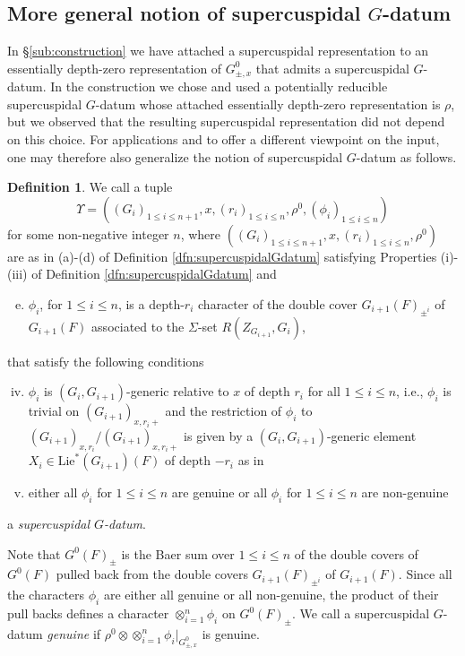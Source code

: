 \documentclass{article}
\theoremstyle{definition}
\newtheorem{dfn}[thm]{Definition}
\numberwithin{equation}{subsection}
\renewcommand{\-}{\hyp{}}
\begin{document}
\subsection{More general notion of supercuspidal $G$-datum} \label{sub:alternativeinput}
In \S\ref{sub:construction} we have attached a supercuspidal representation to an essentially depth-zero representation of $G^0_{\pm, x}$ that admits a supercuspidal $G$-datum. In the construction we chose and used a potentially reducible supercuspidal $G$-datum whose attached essentially depth-zero representation is $\rho$, but we observed that the resulting supercuspidal representation did not depend on this choice. For applications and to offer a different viewpoint on the input, one may therefore also generalize the notion of supercuspidal $G$-datum as follows.
\begin{dfn}
	We call a tuple 
	\[\Upsilon= ((G_i)_{1\leq i\leq n+1},x,(r_i)_{1\leq i\leq n},\rho^0,(\phi_i)_{1\leq i\leq n}) \]
	for some non-negative integer $n$, where $((G_i)_{1\leq i\leq n+1},x,(r_i)_{1\leq i\leq n},\rho^0)$ are as in (a)-(d) of Definition \ref{dfn:supercuspidalGdatum} satisfying Properties (i)-(iii) of Definition \ref{dfn:supercuspidalGdatum} and 
	\begin{enumerate}[(a)]
		\setcounter{enumi}{4}
		\item $\phi_i$, for $1 \leq i \leq n$, is a depth-$r_i$ character of the double cover $G_{i+1}(F)_{\pm^i}$ of $G_{i+1}(F)$ associated to the $\Sigma$-set $R(Z_{G_{i+1}},G_i)$, 
	\end{enumerate}
	that satisfy the following conditions 
	\begin{enumerate}[(i)]
		\setcounter{enumi}{3}
		\item $\phi_i$ is $(G_i, G_{i+1})$-generic relative to $x$ of depth $r_i$ for all $1 \leq i \leq n$, i.e., $\phi_i$ is trivial on $(G_{i+1})_{x,r_i+}$ and the restriction of $\phi_i$ to $(G_{i+1})_{x,r_i}/(G_{i+1})_{x,r_i+}$ is given by a $(G_i, G_{i+1})$-generic element $X_i \in \mathrm{Lie}^*(G_{i+1})(F)$ of depth $-r_i$ as in \cite[Definition~3.8]{Fintzen-IHES} \item either all $\phi_i$ for $1 \leq i \leq n$ are genuine or all $\phi_i$ for $1 \leq i \leq n$ are non-genuine 
	\end{enumerate}
	a \emph{supercuspidal $G$-datum}. 
	
	Note that $G^0(F)_{\pm}$ is the Baer sum  over $1 \leq i \leq n$ of the double covers of $G^0(F)$ pulled back from the double covers $G_{i+1}(F)_{\pm^i}$ of $G_{i+1}(F)$. Since all the characters $\phi_i$ are either all genuine or all non-genuine, the product of their pull backs defines a character $\otimes_{i=1}^n \phi_i$ on $G^0(F)_{\pm}$. 
	We call a supercuspidal $G$-datum \emph{genuine} if $\rho^0 \otimes \otimes_{i=1}^n \phi_i|_{G^0_{\pm, x}}$ is genuine. 


\end{dfn}
\end{document}
